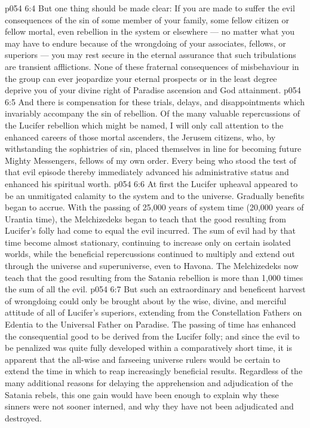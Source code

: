 \vs p054 6:4 But one thing should be made clear: If you are made to suffer the evil consequences of the sin of some member of your family, some fellow citizen or fellow mortal, even rebellion in the system or elsewhere --- no matter what you may have to endure because of the wrongdoing of your associates, fellows, or superiors --- you may rest secure in the eternal assurance that such tribulations are transient afflictions. None of these fraternal consequences of misbehaviour in the group can ever jeopardize your eternal prospects or in the least degree deprive you of your divine right of Paradise ascension and God attainment.
\vs p054 6:5 And there is compensation for these trials, delays, and disappointments which invariably accompany the sin of rebellion. Of the many valuable repercussions of the Lucifer rebellion which might be named, I will only call attention to the enhanced careers of those mortal ascenders, the Jerusem citizens, who, by withstanding the sophistries of sin, placed themselves in line for becoming future Mighty Messengers, fellows of my own order. Every being who stood the test of that evil episode thereby immediately advanced his administrative status and enhanced his spiritual worth.
\vs p054 6:6 \pc At first the Lucifer upheaval appeared to be an unmitigated calamity to the system and to the universe. Gradually benefits began to accrue. With the passing of 25,000 years of system time (20,000 years of Urantia time), the Melchizedeks began to teach that the good resulting from Lucifer’s folly had come to equal the evil incurred. The sum of evil had by that time become almost stationary, continuing to increase only on certain isolated worlds, while the beneficial repercussions continued to multiply and extend out through the universe and superuniverse, even to Havona. The Melchizedeks now teach that the good resulting from the Satania rebellion is more than 1,000 times the sum of all the evil.
\vs p054 6:7 But such an extraordinary and beneficent harvest of wrongdoing could only be brought about by the wise, divine, and merciful attitude of all of Lucifer’s superiors, extending from the Constellation Fathers on Edentia to the Universal Father on Paradise. The passing of time has enhanced the consequential good to be derived from the Lucifer folly; and since the evil to be penalized was quite fully developed within a comparatively short time, it is apparent that the all\hyp{}wise and farseeing universe rulers would be certain to extend the time in which to reap increasingly beneficial results. Regardless of the many additional reasons for delaying the apprehension and adjudication of the Satania rebels, this one gain would have been enough to explain why these sinners were not sooner interned, and why they have not been adjudicated and destroyed.
